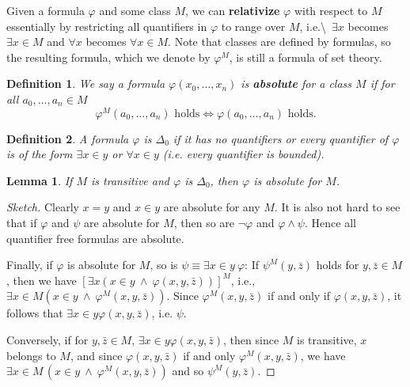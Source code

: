 \documentclass{article}
\newtheorem{lemma}[theorem]{Lemma}
\newtheorem{definition}{Definition}[section]
\begin{document}
Given a formula ${}\varphi$ and some class $M$, we can \textbf{relativize}
${}\varphi$ with respect to $M$ essentially by restricting all quantifiers in ${}\varphi$ to range over $M$, i.e.{\textbackslash}~$\exists x$ becomes $\exists x \in M$ and $\forall x$ becomes $\forall x \in M$. Note that classes are defined by formulas, so the resulting formula, which we denote by $\varphi^M$, is still a formula of set theory.

\begin{definition}We say a formula $\varphi(x_0, \ldots, x_n)$ is \textbf{absolute} for a class $M$ if for all $a_0, \ldots, a_n \in M$
\begin{equation}
\varphi^M(a_0, \ldots, a_n) \text{ holds} \iff  \varphi(a_0, \ldots, a_n) \text{ holds}.
\end{equation}

\end{definition}\begin{definition}A formula ${}\varphi$ is $\Delta_0$ if it has no quantifiers or every quantifier of ${}\varphi$ is of the form $\exists x \in y$ or $\forall x \in y$ (i.e. every quantifier is \textit{bounded}).

\end{definition}\begin{lemma}If $M$ is transitive and ${}\varphi$ is $\Delta_0$, then ${}\varphi$ is absolute for $M$.

\end{lemma}\begin{proof}[Sketch]Clearly $x=y$ and $x\in y$ are absolute for any $M$. It is also not hard to see that if ${}\varphi$ and ${}\psi$ are absolute for $M$, then so are $\neg \varphi$ and $\varphi \wedge \psi$. Hence all quantifier free formulas are absolute.

Finally, if ${}\varphi$ is absolute for $M$, so is $\psi \equiv \exists x \in y \: \varphi$:
If $\psi^M(y,\bar{z})$ holds for $y,\bar{z} \in M$, then we have $[\exists x (x \in y \: \wedge \: \varphi(x,y,\bar{z}))]^M$, i.e., $\exists x \in M(x \in y \: \wedge \: \varphi^M(x,y,\bar{z}))$. Since $\varphi^M(x,y,\bar{z})$ if and only if $\varphi(x,y,\bar{z})$, it follows that $\exists x\in y \varphi(x,y,\bar{z})$, i.e. ${}\psi$.

Conversely, if for $y,\bar{z} \in M$, $\exists x\in y \varphi(x,y,\bar{z})$, then since $M$ is transitive, $x$ belongs to $M$, and since $\varphi(x,y,\bar{z})$ if and only $\varphi^M(x,y,\bar{z})$, we have $\exists x \in M \, (x \in y \: \wedge \: \varphi^M(x,y,\bar{z}) )$ and so $\psi^M(y,\bar{z})$.


\end{proof}
\end{document}
